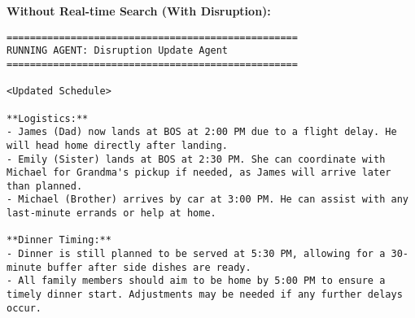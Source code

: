 \textbf{Without Real-time Search (With Disruption):}
\begin{lstlisting}[style=JSONStyle, caption=Sample JSON Output from Agent Pipeline, label=lst:data_collection]
==================================================
RUNNING AGENT: Disruption Update Agent
==================================================

<Updated Schedule>

**Logistics:**
- James (Dad) now lands at BOS at 2:00 PM due to a flight delay. He will head home directly after landing.
- Emily (Sister) lands at BOS at 2:30 PM. She can coordinate with Michael for Grandma's pickup if needed, as James will arrive later than planned.
- Michael (Brother) arrives by car at 3:00 PM. He can assist with any last-minute errands or help at home.

**Dinner Timing:**
- Dinner is still planned to be served at 5:30 PM, allowing for a 30-minute buffer after side dishes are ready.
- All family members should aim to be home by 5:00 PM to ensure a timely dinner start. Adjustments may be needed if any further delays occur.

\end{lstlisting}

%
